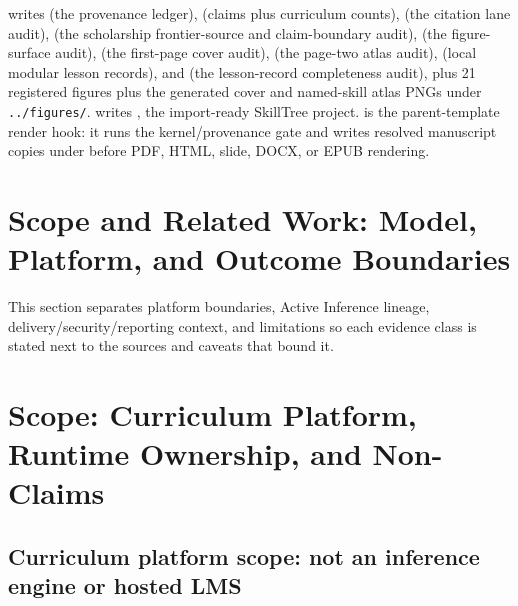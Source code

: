 \documentclass[
  english,
]{article}
\begin{document}
 writes 
(the provenance ledger), 
(claims plus curriculum counts),
 (the citation lane
audit),  (the
scholarship frontier-source and claim-boundary audit),
 (the figure-surface
audit),  (the first-page
cover audit), 
(the page-two atlas audit),
 (local modular lesson
records), and  (the
lesson-record completeness audit), plus 21 registered figures plus the
generated cover and named-skill atlas PNGs under \texttt{../figures/}.
 writes
, the import-ready SkillTree
project.  is the
parent-template render hook: it runs the kernel/provenance gate and
writes resolved manuscript copies under 
before PDF, HTML, slide, DOCX, or EPUB rendering.

\newpage

\section{Scope and Related Work: Model, Platform, and Outcome
Boundaries}\label{scope-and-related-work-model-platform-and-outcome-boundaries}

This section separates platform boundaries, Active Inference lineage,
delivery/security/reporting context, and limitations so each evidence
class is stated next to the sources and caveats that bound it.

\newpage

\section{Scope: Curriculum Platform, Runtime Ownership, and
Non-Claims}\label{sec:scope-platform-curriculum-boundaries}

\subsection{Curriculum platform scope: not an inference engine or hosted
LMS}\label{curriculum-platform-scope-not-an-inference-engine-or-hosted-lms}
\end{document}
